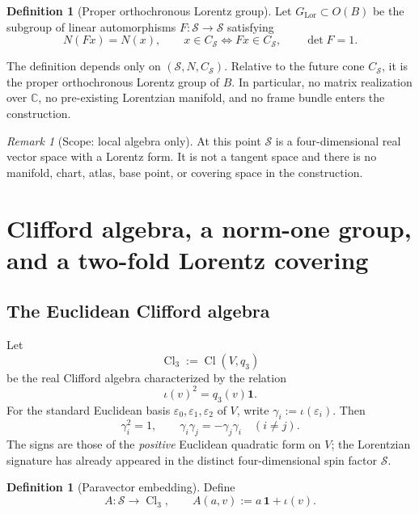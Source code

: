 \documentclass[11pt,a4paper]{article}
\theoremstyle{definition}
\newtheorem{definition}[theorem]{Definition}
\theoremstyle{remark}
\newtheorem{remark}[theorem]{Remark}
\newcommand{\Smodel}{\mathcal{S}}
\newcommand{\Cl}{\operatorname{Cl}}
\newcommand{\LorG}{G_{\mathrm{Lor}}}
\begin{document}
\begin{definition}[Proper orthochronous Lorentz group]
\label{def:GLor}
Let \(\LorG\subset O(B)\) be the subgroup of linear automorphisms
\(F:\Smodel\to\Smodel\) satisfying
\[
   N(Fx)=N(x),\qquad
   x\in C_{\Smodel}\Longleftrightarrow Fx\in C_{\Smodel},
   \qquad
   \det F=1.
\tag{2.3}
\]
\end{definition}

The definition depends only on \((\Smodel,N,C_{\Smodel})\).  Relative to the
future cone \(C_{\Smodel}\), it is the proper orthochronous Lorentz group of
\(B\).  In particular,
no matrix realization over \(\mathbb C\), no pre-existing Lorentzian manifold,
and no frame bundle enters the construction.

\begin{remark}[Scope: local algebra only]
\label{bdry:no-manifold-yet}
At this point \(\Smodel\) is a four-dimensional real vector space with a
Lorentz form.  It is not a tangent space and there is no manifold,
chart, atlas, base point, or covering space in the construction.
\end{remark}

\clearpage
\section{Clifford algebra, a norm-one group, and a two-fold Lorentz covering}
\label{sec:clifford}

\subsection{The Euclidean Clifford algebra}

Let
\[
   \Cl_{3}:=\Cl(V,q_{3})
\]
be the real Clifford algebra characterized by the relation
\[
   \iota(v)^{2}=q_{3}(v)\mathbf{1}.
\tag{3.1}
\]
For the standard Euclidean basis
\(\varepsilon_{0},\varepsilon_{1},\varepsilon_{2}\) of \(V\), write
\(\gamma_{i}:=\iota(\varepsilon_{i})\).  Then
\[
   \gamma_{i}^{2}=1,\qquad
   \gamma_{i}\gamma_{j}=-\gamma_{j}\gamma_{i}
   \quad(i\neq j).
\tag{3.2}
\]
The signs are those of the \emph{positive} Euclidean quadratic form on
\(V\); the Lorentzian signature has already appeared in the distinct
four-dimensional spin factor \(\Smodel\).

\begin{definition}[Paravector embedding]
\label{def:paravector}
Define
\[
   A:\Smodel\longrightarrow\Cl_{3},
   \qquad
   A(a,v):=a\,\mathbf{1}+\iota(v).
\tag{3.3}
\]
\end{definition}
\end{document}
